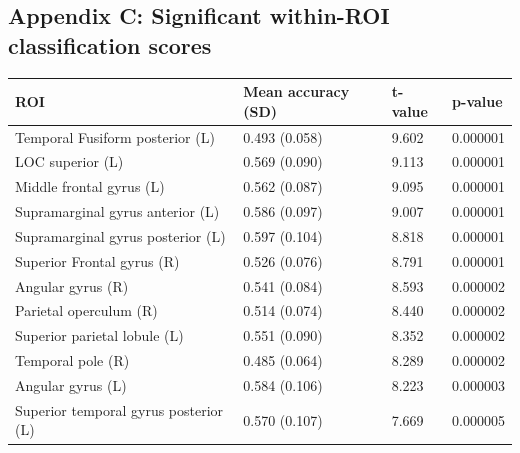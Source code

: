 \documentclass[jou,12pt,a4paper]{apa6}
\begin{document}
\newpage
\vspace*{1px}
\subsection{\LARGE \textnormal{Appendix C: Significant within-ROI classification scores}}
\vspace{10px}

\begin{table}[ht]
\begin{threeparttable}
\fontsize{9}{8}\selectfont
\begin{tabular*}{1\textwidth}{l @{\extracolsep{\fill}} lll}
\hline
\textbf{ROI}                     & \textbf{Mean accuracy (SD)} & \textbf{t-value} & \textbf{p-value}\tnote{1} \\ \hline
Temporal Fusiform posterior (L)     & 0.493 (0.058)               & 9.602            & 0.000001         \\
LOC superior (L)                   & 0.569 (0.090)               & 9.113            & 0.000001         \\
Middle frontal gyrus (L)                        & 0.562 (0.087)               & 9.095            & 0.000001         \\
Supramarginal gyrus anterior (L)   & 0.586 (0.097)               & 9.007            & 0.000001         \\
Supramarginal gyrus posterior (L)   & 0.597 (0.104)               & 8.818            & 0.000001         \\
Superior Frontal gyrus (R)                       & 0.526 (0.076)               & 8.791            & 0.000001         \\
Angular gyrus (R)              & 0.541 (0.084)               & 8.593            & 0.000002         \\
Parietal operculum (R)         & 0.514 (0.074)               & 8.440            & 0.000002         \\
Superior parietal lobule (L)     & 0.551 (0.090)               & 8.352            & 0.000002         \\
Temporal pole (R)              & 0.485 (0.064)               & 8.289            & 0.000002         \\
Angular gyrus (L)               & 0.584 (0.106)               & 8.223            & 0.000003         \\
Superior temporal gyrus posterior (L)                  & 0.570 (0.107)               & 7.669            & 0.000005         \\

\end{tabular*}
\end{threeparttable}
\end{table}
\end{document}
